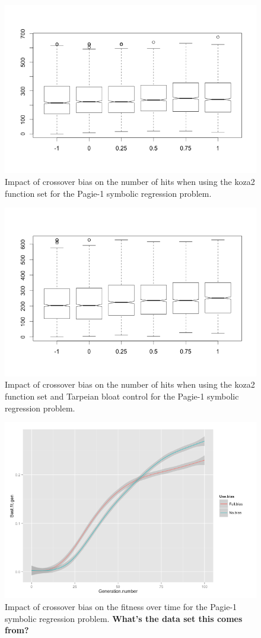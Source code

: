 \documentclass{sig-alternate}
\begin{document}
\begin{figure}
\centering
\includegraphics[width=0.45 \textwidth]{Plots/Pagie-1-koza2_no_Tarpeian.png}
\caption{Impact of crossover bias on the number of hits when using the koza2 function set for the Pagie-1 
symbolic regression problem.}
\label{fig:Pagie1Koza2}
\end{figure}

\begin{figure}
\centering
\includegraphics[width=0.45 \textwidth]{Plots/Pagie-1-tarp.png}
\caption{Impact of crossover bias on the number of hits when using the koza2 function set and Tarpeian bloat 
control for the Pagie-1 symbolic regression problem.}
\label{fig:Pagie1Koza2Tarpeian}
\end{figure}


\begin{figure}
\centering
\includegraphics[width=0.45 \textwidth]{Plots/Pagie-1_fitness_vs_time.png}
\caption{Impact of crossover bias on the fitness over time for the Pagie-1 symbolic regression problem. \textbf{What's the data set this comes from?}}
\label{fig:Pagie1FitnessOverTime}
\end{figure}
\end{document}
